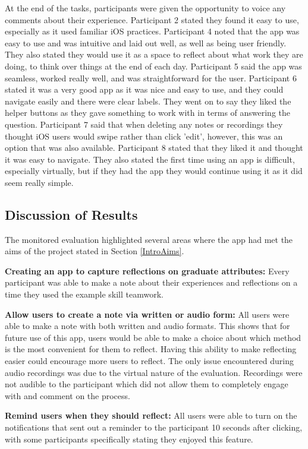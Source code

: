 \documentclass{l4proj}
\begin{document}
At the end of the tasks, participants were given the opportunity to voice any comments about their experience. Participant 2 stated they found it easy to use, especially as it used familiar iOS practices. Participant 4 noted that the app was easy to use and was intuitive and laid out well, as well as being user friendly. They also stated they would use it as a space to reflect about what work they are doing, to think over things at the end of each day. Participant 5 said the app was seamless, worked really well, and was straightforward for the user. Participant 6 stated it was a very good app as it was nice and easy to use, and they could navigate easily and there were clear labels. They went on to say they liked the helper buttons as they gave something to work with in terms of answering the question. Participant 7 said that when deleting any notes or recordings they thought iOS users would swipe rather than click 'edit', however, this was an option that was also available. Participant 8 stated that they liked it and thought it was easy to navigate. They also stated the first time using an app is difficult, especially virtually, but if they had the app they would continue using it as it did seem really simple.

\subsection{Discussion of Results}

The monitored evaluation highlighted several areas where the app had met the aims of the project stated in Section \ref{IntroAims}.

\textbf{Creating an app to capture reflections on graduate attributes:} Every participant was able to make a note about their experiences and reflections on a time they used the example skill teamwork.

\textbf{Allow users to create a note via written or audio form:} All users were able to make a note with both written and audio formats. This shows that for future use of this app, users would be able to make a choice about which method is the most convenient for them to reflect. Having this ability to make reflecting easier could encourage more users to reflect. The only issue encountered during audio recordings was due to the virtual nature of the evaluation. Recordings were not audible to the participant which did not allow them to completely engage with and comment on the process.
 
\textbf{Remind users when they should reflect:} All users were able to turn on the notifications that sent out a reminder to the participant 10 seconds after clicking, with some participants specifically stating they enjoyed this feature. 
\end{document}
